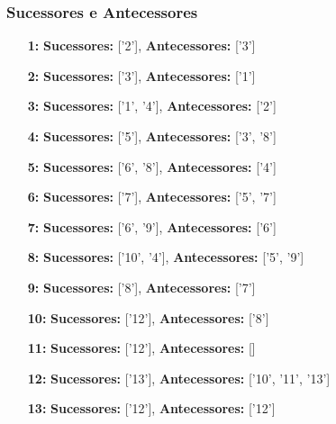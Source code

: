 \documentclass[a4paper,12pt]{article}
\begin{document}
\subsubsection*{Sucessores e Antecessores}
\begin{itemize}[leftmargin=*]
    \item[\textbf{1:}] \textbf{Sucessores:} ['2'], \textbf{Antecessores:} ['3']
    \item[\textbf{2:}] \textbf{Sucessores:} ['3'], \textbf{Antecessores:} ['1']
    \item[\textbf{3:}] \textbf{Sucessores:} ['1', '4'], \textbf{Antecessores:} ['2']
    \item[\textbf{4:}] \textbf{Sucessores:} ['5'], \textbf{Antecessores:} ['3', '8']
    \item[\textbf{5:}] \textbf{Sucessores:} ['6', '8'], \textbf{Antecessores:} ['4']
    \item[\textbf{6:}] \textbf{Sucessores:} ['7'], \textbf{Antecessores:} ['5', '7']
    \item[\textbf{7:}] \textbf{Sucessores:} ['6', '9'], \textbf{Antecessores:} ['6']
    \item[\textbf{8:}] \textbf{Sucessores:} ['10', '4'], \textbf{Antecessores:} ['5', '9']
    \item[\textbf{9:}] \textbf{Sucessores:} ['8'], \textbf{Antecessores:} ['7']
    \item[\textbf{10:}] \textbf{Sucessores:} ['12'], \textbf{Antecessores:} ['8']
    \item[\textbf{11:}] \textbf{Sucessores:} ['12'], \textbf{Antecessores:} []
    \item[\textbf{12:}] \textbf{Sucessores:} ['13'], \textbf{Antecessores:} ['10', '11', '13']
    \item[\textbf{13:}] \textbf{Sucessores:} ['12'], \textbf{Antecessores:} ['12']
\end{itemize}
\end{document}
